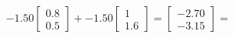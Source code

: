 \documentclass[preview]{standalone}
\begin{document}
\begin{align*}
-1.50 \begin{bmatrix} 0.8 \\ 0.5 \end{bmatrix} + -1.50 \begin{bmatrix} 1 \\ 1.6 \end{bmatrix} = \begin{bmatrix} -2.70 \\ -3.15 \end{bmatrix} =
\end{align*}
\end{document}
